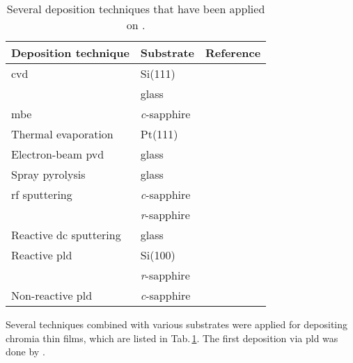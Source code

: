 \begin{table}
    \centering
    \caption{Several deposition techniques that have been applied on \cro.}
    \begin{tabular}{lll}
        \toprule
        Deposition technique        & Substrate             & Reference     \\
        \midrule
        \gls{cvd}                   & Si(111)               & \cite{cheng2000,cheng2001}    \\
                                    & glass                 & \cite{cheng1996}              \\
        \gls{mbe}                   & \textit{c}-sapphire   & \cite{farrell2015,kehoe2016}  \\
        Thermal evaporation         & Pt(111)               & \cite{robbert1998}            \\
        Electron-beam \gls{pvd}     & glass                 & \cite{al-kuhaili2007}         \\
        Spray pyrolysis             & glass                 & \cite{arca2011}               \\
        \gls{rf} sputtering         & \textit{c}-sapphire   & \cite{stepanov2021,polyakov2022a} \\
                                    & \textit{r}-sapphire   & \cite{polyakov2022}           \\
        Reactive \gls{dc} sputtering& glass                 & \cite{guillen2021}            \\
        Reactive \gls{pld}          & Si(100)               & \cite{caricato2010}           \\
                                    & \textit{r}-sapphire   & \cite{punugupati2015}         \\
        Non-reactive \gls{pld}      & \textit{c}-sapphire   & \cite{singh2019,arca2017,kehoe2016}   \\
        \bottomrule
    \end{tabular}
    \label{Tab:Theory_Cr2O3_depositionTechniques}
\end{table}
Several techniques combined with various substrates were applied for depositing chromia thin films, which are listed in Tab.\,\ref{Tab:Theory_Cr2O3_depositionTechniques}.
The first deposition via \gls{pld} was done by \textcite{tabbal2006}.


